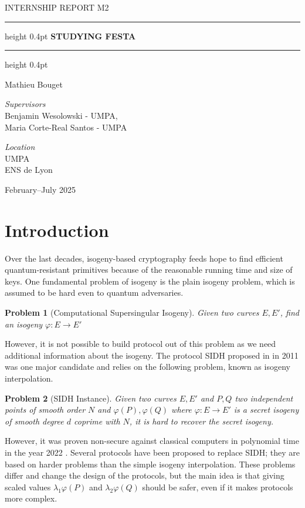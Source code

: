 \documentclass[12pt,a4paper]{article}
\newtheorem{problem}{Problem}
\newcommand{\reporttitle}[1]{%
	\vspace*{1cm} \begin{center} \large\MakeUppercase{#1}
\end{center} \vspace{1cm} }
\newcommand{\maintitle}[1]{%
	\begin{center} \hrule height 0.4pt\vspace{0.4em}
\Large\bfseries\MakeUppercase{#1}\\ \vspace{0.4em}\hrule height 0.4pt \end{center}
\vspace{1.5cm} }
\newcommand{\authorname}[1]{%
\begin{center} #1 \end{center} \vspace{1cm} }
\newcommand{\supervisors}[2]{%
	\begin{center} \textit{Supervisors}\\ #1,\\
	#2
\end{center} \vspace{1cm} }
\newcommand{\locationinfo}[2]{%
	\begin{center} \textit{Location}\\ #1\\ #2 \end{center}
\vfill }
\newcommand{\daterange}[1]{%
\begin{center} #1 \end{center} }
\begin{document}
	\reporttitle{Internship report M2}

	\maintitle{Studying FESTA}

	\authorname{Mathieu Bouget}

	\supervisors{Benjamin Wesolowski - UMPA}{Maria Corte-Real Santos - UMPA}

	\locationinfo{UMPA}{ENS de Lyon}

	\daterange{February--July 2025}

	\newpage \setcounter{page}{1} \pagestyle{plain}

	\tableofcontents

	\section{Introduction}


	Over the last decades, isogeny-based cryptography feeds hope to find efficient
	quantum-resistant primitives because of the reasonable running time and size of keys. One fundamental
	problem of isogeny is the plain isogeny problem, which is assumed to be hard even to quantum adversaries. 

	\begin{problem}[Computational Supersingular Isogeny]\label{pb:CSSI}
	Given two curves $E,E'$, find an isogeny $\varphi:E\to E'$ 
	\end{problem}

	However, it is not possible to build protocol out of this problem as we need additional information
	about the isogeny. The protocol SIDH proposed in \cite{sidh} in 2011 was one major candidate and
	relies on the following problem, known as isogeny interpolation.

	\begin{problem}[SIDH Instance]\label{pb:sidh}
	Given two curves $E,E'$ and $P,Q$ two independent points of smooth order $N$ and $\varphi(P),\varphi(Q)$
	where $\varphi:E\to E'$ 
	is a secret isogeny of smooth degree $d$ coprime with $N$, it is hard to recover the secret isogeny.
	\end{problem}

	However, it was proven non-secure against classical computers in polynomial time
	in the year 2022 \cite{firstattacksidh}. Several protocols have been proposed to replace SIDH; they are
	based on harder problems than the simple isogeny interpolation. These problems differ and change the
	design of the protocols, but the main idea is that giving scaled values $\lambda_1\varphi(P)$ and
	 $\lambda_2\varphi(Q)$ should be safer, even if it makes protocols more complex.
\end{document}
